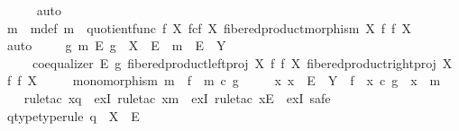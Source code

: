 \begin{isabellebody}
\ \ \ \ \isamarkupfalse%
\ auto\isanewline
\ \ \isamarkupfalse%
\ m\ \ m{\isacharunderscore}{\kern0pt}def{\isacharcolon}{\kern0pt}\ {\isachardoublequoteopen}m\ {\isacharequal}{\kern0pt}\ quotient{\isacharunderscore}{\kern0pt}func\ f\ {\isacharparenleft}{\kern0pt}X\ \isactrlbsub f\isactrlesub {\isasymtimes}\isactrlsub c\isactrlbsub f\isactrlesub \ X{\isacharcomma}{\kern0pt}\ fibered{\isacharunderscore}{\kern0pt}product{\isacharunderscore}{\kern0pt}morphism\ X\ f\ f\ X{\isacharparenright}{\kern0pt}{\isachardoublequoteclose}\isanewline
\ \ \ \ \isamarkupfalse%
\ auto\isanewline
\ \ \isamarkupfalse%
\ {\isachardoublequoteopen}{\isasymexists}\ g\ m\ E{\isachardot}{\kern0pt}\ g\ {\isacharcolon}{\kern0pt}\ X\ {\isasymrightarrow}\ E\ {\isasymand}\ m\ {\isacharcolon}{\kern0pt}\ E\ {\isasymrightarrow}\ Y\ \isanewline
\ \ \ \ {\isasymand}\ coequalizer\ E\ g\ {\isacharparenleft}{\kern0pt}fibered{\isacharunderscore}{\kern0pt}product{\isacharunderscore}{\kern0pt}left{\isacharunderscore}{\kern0pt}proj\ X\ f\ f\ X{\isacharparenright}{\kern0pt}\ {\isacharparenleft}{\kern0pt}fibered{\isacharunderscore}{\kern0pt}product{\isacharunderscore}{\kern0pt}right{\isacharunderscore}{\kern0pt}proj\ X\ f\ f\ X{\isacharparenright}{\kern0pt}\isanewline
\ \ \ \ {\isasymand}\ monomorphism\ m\ {\isasymand}\ f\ {\isacharequal}{\kern0pt}\ m\ {\isasymcirc}\isactrlsub c\ g\isanewline
\ \ \ \ {\isasymand}\ {\isacharparenleft}{\kern0pt}{\isasymforall}x{\isachardot}{\kern0pt}\ x\ {\isacharcolon}{\kern0pt}\ E\ {\isasymrightarrow}\ Y\ {\isasymlongrightarrow}\ f\ {\isacharequal}{\kern0pt}\ x\ {\isasymcirc}\isactrlsub c\ g\ {\isasymlongrightarrow}\ x\ {\isacharequal}{\kern0pt}\ m{\isacharparenright}{\kern0pt}{\isachardoublequoteclose}\isanewline
\ \ \isamarkupfalse%
\ {\isacharparenleft}{\kern0pt}rule{\isacharunderscore}{\kern0pt}tac\ x{\isacharequal}{\kern0pt}{\isachardoublequoteopen}q{\isachardoublequoteclose}\ \ exI{\isacharcomma}{\kern0pt}\ rule{\isacharunderscore}{\kern0pt}tac\ x{\isacharequal}{\kern0pt}{\isachardoublequoteopen}m{\isachardoublequoteclose}\ \ exI{\isacharcomma}{\kern0pt}\ rule{\isacharunderscore}{\kern0pt}tac\ x{\isacharequal}{\kern0pt}{\isachardoublequoteopen}E{\isachardoublequoteclose}\ \ exI{\isacharcomma}{\kern0pt}\ safe{\isacharparenright}{\kern0pt}\isanewline
\ \ \ \ \isamarkupfalse%
\ q{\isacharunderscore}{\kern0pt}type{\isacharbrackleft}{\kern0pt}type{\isacharunderscore}{\kern0pt}rule{\isacharbrackright}{\kern0pt}{\isacharcolon}{\kern0pt}\ {\isachardoublequoteopen}q\ {\isacharcolon}{\kern0pt}\ X\ {\isasymrightarrow}\ E{\isachardoublequoteclose}\isanewline

\end{isabellebody}

